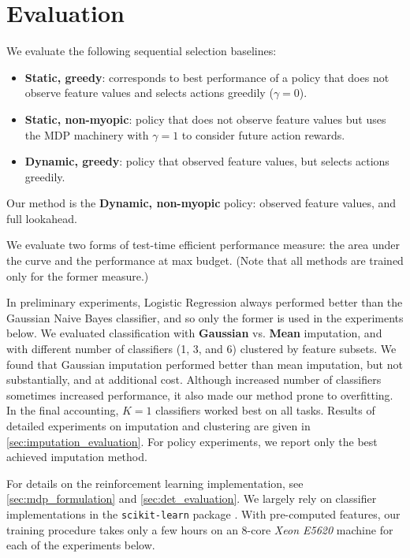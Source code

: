 \section{Evaluation}\label{sec:clf_evaluation}

We evaluate the following sequential selection baselines:

\begin{itemize}
\item \textbf{Static, greedy}: corresponds to best performance of a policy that does not observe feature values and selects actions greedily ($\gamma=0$).
\item \textbf{Static, non-myopic}: policy that does not observe feature values but uses the MDP machinery with $\gamma=1$ to consider future action rewards.
\item \textbf{Dynamic, greedy}: policy that observed feature values, but selects actions greedily.
\end{itemize}

Our method is the \textbf{Dynamic, non-myopic} policy: observed feature values, and full lookahead.

We evaluate two forms of test-time efficient performance measure: the area under the curve and the performance at max budget.
(Note that all methods are trained only for the former measure.)

In preliminary experiments, Logistic Regression always performed better than the Gaussian Naive Bayes classifier, and so only the former is used in the experiments below.
We evaluated classification with \textbf{Gaussian} vs. \textbf{Mean} imputation, and with different number of classifiers (1, 3, and 6) clustered by feature subsets.
We found that Gaussian imputation performed better than mean imputation, but not substantially, and at additional cost.
Although increased number of classifiers sometimes increased performance, it also made our method prone to overfitting.
In the final accounting, $K=1$ classifiers worked best on all tasks.
Results of detailed experiments on imputation and clustering are given in \autoref{sec:imputation_evaluation}.
For policy experiments, we report only the best achieved imputation method.

For details on the reinforcement learning implementation, see \autoref{sec:mdp_formulation} and \autoref{sec:det_evaluation}.
We largely rely on classifier implementations in the \texttt{scikit-learn} package \parencite{Pedregosa2011}.
With pre-computed features, our training procedure takes only a few hours on an $8$-core \emph{Xeon E5620} machine for each of the experiments below.

